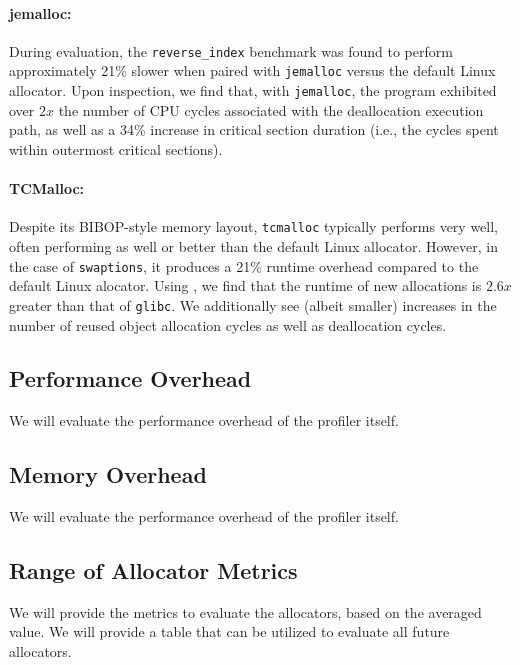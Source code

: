 \paragraph{jemalloc:}
During evaluation, the \texttt{reverse\_index} benchmark was found to perform approximately 21\% slower when paired with \texttt{jemalloc} versus the default Linux allocator. Upon inspection, we find that, with \texttt{jemalloc}, the program exhibited over $2x$ the number of CPU cycles associated with the deallocation execution path, as well as a 34\% increase in critical section duration (i.e., the cycles spent within outermost critical sections).

\paragraph{TCMalloc:}
Despite its BIBOP-style memory layout, \texttt{tcmalloc} typically performs very well, often performing as well or better than the default Linux allocator. However, in the case of \texttt{swaptions}, it produces a 21\% runtime overhead compared to the default Linux alocator. Using \MP{}, we find that the runtime of new allocations  is $2.6x$ greater than that of \texttt{glibc}. We additionally see (albeit smaller) increases in the number of reused object allocation cycles as well as deallocation cycles.



\subsection{Performance Overhead}
\label{sec:perf}

We will evaluate the performance overhead of the profiler itself. 

\subsection{Memory Overhead}
\label{sec:memory}

We will evaluate the performance overhead of the profiler itself. 

\subsection{Range of Allocator Metrics}
We will provide the metrics to evaluate the allocators, based on the averaged value. 
We will provide a table that can be utilized to evaluate all future allocators. 

